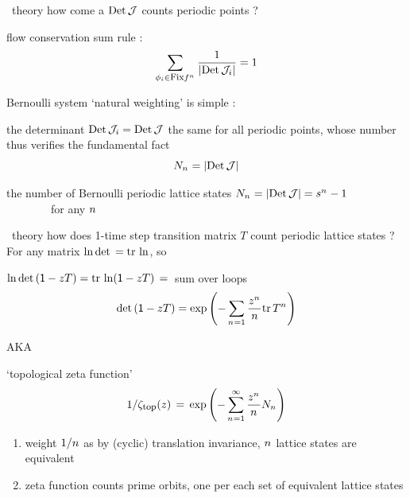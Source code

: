 \begin{frame}{\po\ theory}
how come a $\mbox{\rm Det}\,{\cal J}$ counts periodic points ?
\bigskip

\begin{block}{flow conservation sum rule :}
\[
\sum_{\phi_i{\in\mbox{\footnotesize Fix}f^{{n_{}}}}}
    \frac{1}{|\mbox{\rm Det}\,{\cal J}_i|}
    =1
\]
\end{block}
\medskip

Bernoulli system `natural weighting' is simple :
\medskip

the determinant
$\mbox{\rm Det}\,{\cal J}_i=\mbox{\rm Det}\,{\cal J}$ the same for all periodic points, whose
number thus verifies the {\color{blue}fundamental fact}
\[
N_{n_{}} = |\mbox{\rm Det}\,{\cal J}|
\] %

\medskip


\vfill
    \begin{block}{the number of Bernoulli periodic lattice states}
\(
N_{{n_{}}} = |\mbox{\rm Det}\,{\cal J}| = s^{{n_{}}} - 1
\) %
~~~~~~~~for any ${n_{}}$
    \end{block}
\end{frame}

\begin{frame}{\po\ theory}
how does 1-time step {\color{blue}transition matrix} $T$ count periodic
lattice states ? For any matrix  {\color{blue} $\ln\mbox{\rm det}\,=\mbox{\rm tr}\,\ln$}, so
\begin{block}{$\ln\mbox{\rm det}\,(\mathsf{1}-zT)=\mbox{\rm tr}\,\ln(\mathsf{1}-zT)\,=\,$ sum over loops}
\[
\mbox{\rm det}\,(\mathsf{1}-zT)= \exp \left(-\sum_{{n_{}}=1}\frac{z^{n_{}}}{n}\mbox{\rm tr}\, T^{n_{}}\right)
\]
\end{block}

AKA
\begin{block}{`topological zeta function'}
\[
1/\zeta_{\mbox{\footnotesize top}} (z)
 \,=\,  \exp \left(-\sum_{{n_{}}=1}^\infty
\frac{z^{n_{}}}{{n_{}}} N_{n_{}}
         \right)
\] %
\end{block}
        \begin{enumerate}
              \item
weight ${1}/{{n_{}}}$
as by (cyclic) translation invariance, ${n_{}}$ lattice states are
equivalent
              \item
zeta function counts {\color{blue} prime orbits}, one per each set of equivalent
lattice states
            \end{enumerate}
\end{frame}

